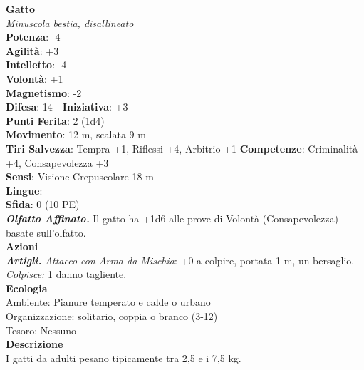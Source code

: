 \begin{multicols}{2}
\medskip\textbf{Gatto}\\
\emph{Minuscola bestia, disallineato}\\
\textbf{Potenza}: -4\\
\textbf{Agilità}: +3\\
\textbf{Intelletto}: -4\\
\textbf{Volontà}: +1\\
\textbf{Magnetismo}: -2\\
\textbf{Difesa}: 14 - \textbf{Iniziativa}: +3\\
\textbf{Punti Ferita}: 2 (1d4)\\
\textbf{Movimento}: 12 m, scalata 9 m\\
\textbf{Tiri Salvezza}:  Tempra +1, Riflessi +4, Arbitrio +1 
\textbf{Competenze}: Criminalità +4, Consapevolezza +3\\
\textbf{Sensi}: Visione Crepuscolare 18 m\\
\textbf{Lingue}: -\\
\textbf{Sfida}: 0 (10 PE)\smallskip\\
\emph{\textbf{Olfatto Affinato.}} Il gatto ha +1d6 alle prove di Volontà (Consapevolezza) basate sull'olfatto.\\
\smallskip\textbf{Azioni}\\
\emph{\textbf{Artigli.} Attacco con Arma da Mischia}: +0 a colpire, portata 1 m, un bersaglio.\\
\emph{Colpisce:} 1 danno tagliente.\\
\textbf{Ecologia}\\
Ambiente: Pianure temperato e calde o urbano\\
Organizzazione: solitario, coppia o branco (3-12)\\
Tesoro: Nessuno\\
\textbf{Descrizione}\\
I gatti da adulti pesano tipicamente tra 2,5 e i 7,5 kg. \\


\end{multicols}
